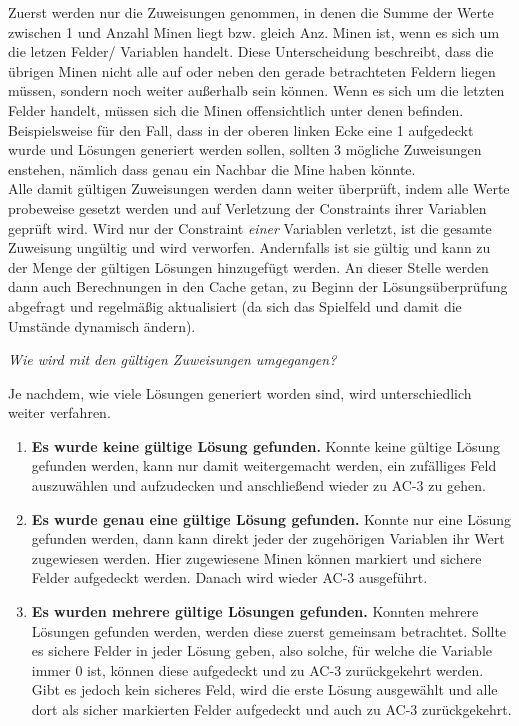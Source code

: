 Zuerst werden nur die Zuweisungen genommen, in denen die Summe der Werte zwischen 1 und Anzahl Minen liegt bzw. gleich Anz. Minen ist, wenn es
sich um die letzen Felder/ Variablen handelt. Diese Unterscheidung beschreibt, dass die übrigen Minen nicht alle auf oder neben den gerade
betrachteten Feldern liegen müssen, sondern noch weiter außerhalb sein können. Wenn es sich um die letzten Felder handelt, müssen sich die
Minen offensichtlich unter denen befinden. Beispielsweise für den Fall, dass in der oberen linken Ecke eine 1 aufgedeckt wurde und Lösungen
generiert werden sollen, sollten 3 mögliche Zuweisungen enstehen, nämlich dass genau ein Nachbar die Mine haben könnte.\\
Alle damit gültigen Zuweisungen werden dann weiter überprüft, indem alle Werte probeweise gesetzt werden und auf Verletzung der Constraints
ihrer Variablen geprüft wird. Wird nur der Constraint \textit{einer} Variablen verletzt, ist die gesamte Zuweisung ungültig und wird verworfen.
Andernfalls ist sie gültig und kann zu der Menge der gültigen Lösungen hinzugefügt werden. An dieser Stelle werden dann auch Berechnungen
in den Cache getan, zu Beginn der Lösungsüberprüfung abgefragt und regelmäßig aktualisiert (da sich das Spielfeld und damit die Umstände
dynamisch ändern).

\textit{Wie wird mit den gültigen Zuweisungen umgegangen?}

Je nachdem, wie viele Lösungen generiert worden sind, wird unterschiedlich weiter verfahren.
\begin{enumerate}
    \item \textbf{Es wurde keine gültige Lösung gefunden.} Konnte keine gültige Lösung gefunden werden, kann nur damit weitergemacht werden,
    ein zufälliges Feld auszuwählen und aufzudecken und anschließend wieder zu AC-3 zu gehen.
    \item \textbf{Es wurde genau eine gültige Lösung gefunden.} Konnte nur eine Lösung gefunden werden, dann kann direkt jeder der zugehörigen
    Variablen ihr Wert zugewiesen werden. Hier zugewiesene Minen können markiert und sichere Felder aufgedeckt werden. Danach wird wieder
    AC-3 ausgeführt. 
    \item \textbf{Es wurden mehrere gültige Lösungen gefunden.} Konnten mehrere Lösungen gefunden werden, werden diese zuerst gemeinsam betrachtet.
    Sollte es sichere Felder in jeder Lösung geben, also solche, für welche die Variable immer 0 ist, können diese aufgedeckt und zu AC-3
    zurückgekehrt werden. Gibt es jedoch kein sicheres Feld, wird die erste Lösung ausgewählt und alle dort als sicher markierten Felder
    aufgedeckt und auch zu AC-3 zurückgekehrt.
\end{enumerate}

